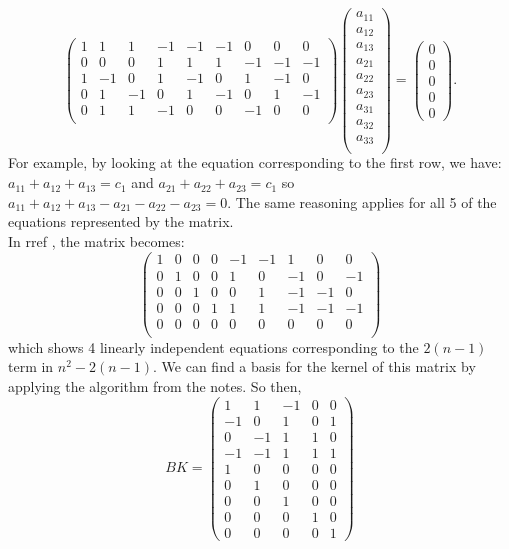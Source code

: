 \documentclass[12pt]{article}
\begin{document}
\[
\begin{pmatrix}
1 & 1 &  1 &  -1 & -1  & -1 & 0 & 0 & 0\\
0  &  0  &  0 & 1 & 1 &  1 &  -1 & -1  & -1  \\
1  &  -1  &  0 & 1 & -1  &  0 &  1 &  -1  &  0 \\
0  &  1  &  -1 & 0 &  1  &  -1 &  0 &  1  &  -1 \\
0  &  1  &  1 & -1 &  0  &  0 &  -1 &  0  &  0 \\
\end{pmatrix}
\begin{pmatrix}
a_{1 1} \\
a_{1 2} \\
a_{1 3} \\
a_{2 1} \\
a_{2 2 }  \\
a_{2 3 }  \\
a_{3 1 }  \\
a_{3 2 }  \\
a_{3 3 }  \\
\end{pmatrix}
=
\begin{pmatrix}
0\\
0\\
0\\
0\\
0
\end{pmatrix} .
\]
For example, by looking at the equation corresponding to the first row, we have: $a_{11} + a_{12} + a_{13} = c_1$ and $a_{21} + a_{22} + a_{23} = c_1$ so $a_{11} + a_{12} + a_{13} -a_{21} - a_{22} - a_{23} = 0$. The same reasoning applies for all 5 of the equations represented by the matrix. \\In rref , the matrix becomes:
\[ 
\begin{pmatrix}
1 & 0 &  0 &  0 & -1  & -1 & 1 & 0 & 0\\
0  &  1  &  0 & 0 & 1 &  0 &  -1 & 0  & -1  \\
0  &  0  &  1 & 0 & 0  &  1 &  -1 &  -1  &  0 \\
0  &  0  &  0 & 1 &  1  &  1 &  -1 &  -1  &  -1 \\
0  &  0  &  0 & 0 &  0  &  0 &  0 &  0  &  0 \\
\end{pmatrix}\] which shows 4 linearly independent equations corresponding to the $2(n-1)$ term in $n^2 - 2(n -1)$.
We can find a basis for the kernel of this matrix by applying the algorithm from the notes. So then,
$$BK = \begin {pmatrix} 1 & 1 & -1 & 0 & 0\\ -1 & 0 & 1 & 0 & 1\\ 0 & -1 & 1 & 1 & 0\\ -1 & -1 & 1 & 1 & 1\\1 & 0 & 0 & 0 & 0\\
 0 & 1 & 0 & 0 & 0\\ 0 & 0 & 1 & 0 & 0\\ 0 & 0 & 0 & 1 & 0\\  0 & 0 & 0 & 0 & 1 \end{pmatrix}$$
\end{document}
